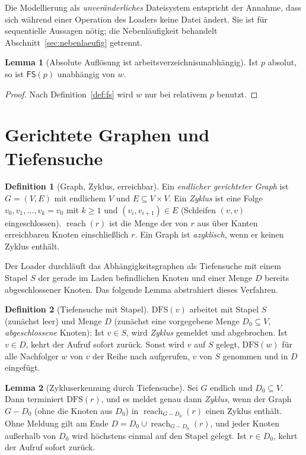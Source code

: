 \documentclass[a4paper,12pt,twoside]{report}
\DeclareRobustCommand{\_}{\ifmmode\mbox{\textunderscore}\else\textunderscore\allowbreak{}\fi}
\theoremstyle{definition}
\newtheorem{definition}{Definition}[chapter]
\newtheorem{lemma}{Lemma}[chapter]
\newcommand{\FS}{\mathsf{FS}}
\begin{document}
Die Modellierung als \emph{unveränderliches} Dateisystem entspricht der Annahme, dass sich während einer Operation des Loaders keine Datei ändert. Sie ist für sequentielle Aussagen nötig; die Nebenläufigkeit behandelt Abschnitt~\ref{sec:nebenlaeufig} getrennt.

\begin{lemma}[Absolute Auflösung ist arbeitsverzeichnisunabhängig]
	\label{lem:abs}
	Ist $p$ absolut, so ist $\FS(p)$ unabhängig von $w$.
\end{lemma}

\begin{proof}
	Nach Definition~\ref{def:fs} wird $w$ nur bei relativem $p$ benutzt.
\end{proof}

\section{Gerichtete Graphen und Tiefensuche}

\begin{definition}[Graph, Zyklus, erreichbar]
	Ein \emph{endlicher gerichteter Graph} ist $G=(V,E)$ mit endlichem $V$ und $E\subseteq V\times V$. Ein \emph{Zyklus} ist eine Folge $v_0,v_1,\ldots,v_k=v_0$ mit $k\ge1$ und $(v_{i},v_{i+1})\in E$ (Schleifen $(v,v)$ eingeschlossen). $\operatorname{reach}(r)$ ist die Menge der von $r$ aus über Kanten erreichbaren Knoten einschließlich $r$. Ein Graph ist \emph{azyklisch}, wenn er keinen Zyklus enthält.
\end{definition}

Der Loader durchläuft das Abhängigkeitsgraphen als Tiefensuche mit einem Stapel $S$ der gerade im Laden befindlichen Knoten und einer Menge $D$ bereits abgeschlossener Knoten. Das folgende Lemma abstrahiert dieses Verfahren.

\begin{definition}[Tiefensuche mit Stapel]
	\label{def:dfs}
	$\mathrm{DFS}(v)$ arbeitet mit Stapel $S$ (zunächst leer) und Menge $D$ (zunächst eine vorgegebene Menge $D_0\subseteq V$, \emph{abgeschlossene} Knoten): Ist $v\in S$, wird \emph{Zyklus} gemeldet und abgebrochen. Ist $v\in D$, kehrt der Aufruf sofort zurück. Sonst wird $v$ auf $S$ gelegt, $\mathrm{DFS}(w)$ für alle Nachfolger $w$ von $v$ der Reihe nach aufgerufen, $v$ von $S$ genommen und in $D$ eingefügt.
\end{definition}

\begin{lemma}[Zykluserkennung durch Tiefensuche]
	\label{lem:dfs}
	Sei $G$ endlich und $D_0\subseteq V$. Dann terminiert $\mathrm{DFS}(r)$, und es meldet genau dann \emph{Zyklus}, wenn der Graph $G-D_0$ (ohne die Knoten aus $D_0$) in $\operatorname{reach}_{G-D_0}(r)$ einen Zyklus enthält. Ohne Meldung gilt am Ende $D=D_0\cup\operatorname{reach}_{G-D_0}(r)$, und jeder Knoten außerhalb von $D_0$ wird höchstens einmal auf den Stapel gelegt. Ist $r\in D_0$, kehrt der Aufruf sofort zurück.
\end{lemma}
 
\end{document}
